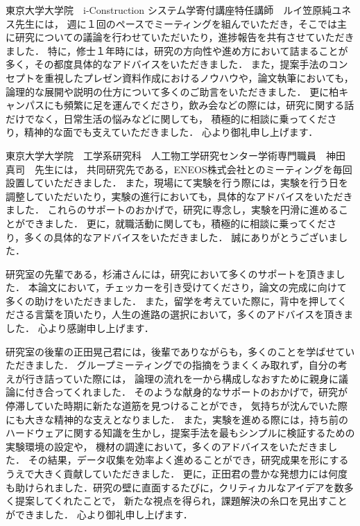 \documentclass[../main]{subfiles}
\begin{document}
東京大学大学院　i-Construction システム学寄付講座特任講師　ルイ笠原純ユネス先生には，
週に１回のペースでミーティングを組んでいただき，そこでは主に研究についての議論を行わせていただいたり，進捗報告を共有させていただきました．
特に，修士１年時には，研究の方向性や進め方において詰まることが多く，その都度具体的なアドバイスをいただきました．
また，提案手法のコンセプトを重視したプレゼン資料作成におけるノウハウや，論文執筆においても，論理的な展開や説明の仕方について多くのご助言をいただきました．
更に柏キャンパスにも頻繁に足を運んでくださり，飲み会などの際には，研究に関する話だけでなく，日常生活の悩みなどに関しても，
積極的に相談に乗ってくださり，精神的な面でも支えていただきました．
心より御礼申し上げます．


東京大学大学院　工学系研究科　人工物工学研究センター学術専門職員　神田　真司　先生には，
共同研究先である，ENEOS株式会社とのミーティングを毎回設置していただきました．
また，現場にて実験を行う際には，実験を行う日を調整していただいたり，実験の進行においても，具体的なアドバイスをいただきました．
これらのサポートのおかげで，研究に専念し，実験を円滑に進めることができました．
更に，就職活動に関しても，積極的に相談に乗ってくださり，多くの具体的なアドバイスをいただきました．
誠にありがとうございました．

研究室の先輩である，杉浦さんには，研究において多くのサポートを頂きました．
本論文において，チェッカーを引き受けてくださり，論文の完成に向けて多くの助けをいただきました．
また，留学を考えていた際に，背中を押してくださる言葉を頂いたり，人生の進路の選択において，多くのアドバイスを頂きました．
心より感謝申し上げます．



研究室の後輩の正田晃己君には，後輩でありながらも，多くのことを学ばせていただきました．
グループミーティングでの指摘をうまくくみ取れず，自分の考えが行き詰っていた際には，
論理の流れを一から構成しなおすために親身に議論に付き合ってくれました．
そのような献身的なサポートのおかげで，研究が停滞していた時期に新たな道筋を見つけることができ，
気持ちが沈んでいた際にも大きな精神的な支えとなりました．
また，実験を進める際には，持ち前のハードウェアに関する知識を生かし，提案手法を最もシンプルに検証するための実験環境の設定や，
機材の調達において，多くのアドバイスをいただきました．
その結果，データ収集を効率よく進めることができ，研究成果を形にするうえで大きく貢献していただきました．
更に，正田君の豊かな発想力には何度も助けられました．研究の壁に直面するたびに，クリティカルなアイデアを数多く提案してくれたことで，
新たな視点を得られ，課題解決の糸口を見出すことができました．
心より御礼申し上げます．
\end{document}

